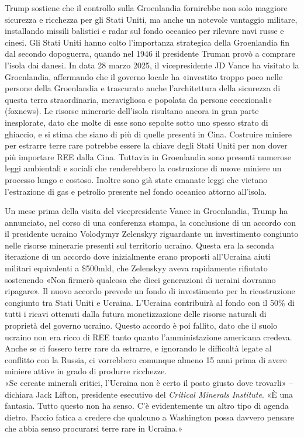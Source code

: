 \documentclass[12pt,a4paper,oneside]{book}
\begin{document}
Trump sostiene che il controllo sulla Groenlandia fornirebbe non solo maggiore sicurezza e ricchezza per gli Stati Uniti, ma anche un notevole vantaggio militare, installando missili balistici e radar sul fondo oceanico per rilevare navi russe e cinesi.
Gli Stati Uniti hanno colto l'importanza strategica della Groenlandia fin dal secondo dopoguerra, quando nel 1946 il presidente Truman provò a comprare l'isola dai danesi. In data 28 marzo 2025, il vicepresidente JD Vance ha visitato la Groenlandia, affermando che il governo locale ha «investito troppo poco nelle persone della Groenlandia e trascurato anche l'architettura della sicurezza di questa terra straordinaria, meravigliosa e popolata da persone eccezionali» (foxnews). 
Le risorse minerarie dell'isola risultano ancora in gran parte inesplorate, dato che molte di esse sono sepolte sotto uno spesso strato di ghiaccio, e si stima che siano di più di quelle presenti in Cina. Costruire miniere per estrarre terre rare potrebbe essere la chiave degli Stati Uniti per non dover più importare REE dalla Cina.
Tuttavia in Groenlandia sono presenti numerose leggi ambientali e sociali che renderebbero la costruzione di nuove miniere un processo lungo e costoso. Inoltre sono già state emanate leggi che vietano l'estrazione di gas e petrolio presente nel fondo oceanico attorno all'isola.

Un mese prima della visita del vicepresidente Vance in Groenlandia, Trump ha annunciato, nel corso di una conferenza stampa, la conclusione di un accordo con il presidente ucraino Volodymyr Zelenskyy riguardante un investimento congiunto nelle risorse minerarie presenti sul territorio ucraino. Questa era la seconda iterazione di un accordo dove inizialmente erano proposti all'Ucraina aiuti militari equivalenti a \$500mld, che Zelenskyy aveva rapidamente rifiutato sostenendo «Non firmerò qualcosa che dieci generazioni di ucraini dovranno ripagare».
Il nuovo accordo prevede un fondo di investimento per la ricostruzione congiunto tra Stati Uniti e Ucraina. L'Ucraina contribuirà al fondo con il 50\% di tutti i ricavi ottenuti dalla futura monetizzazione delle risorse naturali di proprietà del governo ucraino.
Questo accordo è poi fallito, dato che il suolo ucraino non era ricco di REE tanto quanto l'amministazione americana credeva. Anche se ci fossero terre rare da estrarre, e ignorando le difficoltà legate al conflitto con la Russia, ci vorrebbero comunque almeno 15 anni prima di avere miniere attive in grado di produrre ricchezze.\\
«Se cercate minerali critici, l'Ucraina non è certo il posto giusto dove trovarli» – dichiara Jack Lifton, presidente esecutivo del \textit{Critical Minerals Institute}. «È una fantasia. Tutto questo non ha senso. C'è evidentemente un altro tipo di agenda dietro. Faccio fatica a credere che qualcuno a Washington possa davvero pensare che abbia senso procurarsi terre rare in Ucraina.»
\end{document}
